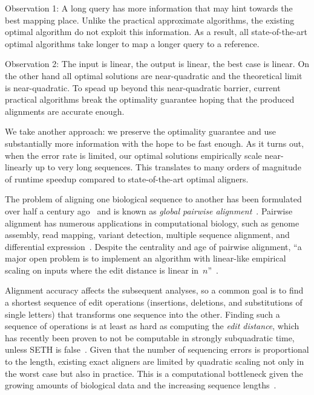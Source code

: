 Observation 1: A long query has more information that may hint towards the best
mapping place. Unlike the practical approximate algorithms, the existing optimal
algorithm do not exploit this information. As a result, all state-of-the-art
optimal algorithms take longer to map a longer query to a reference. 

Observation 2: The input is linear, the output is linear, the best case is
linear. On the other hand all optimal solutions are near-quadratic and the
theoretical limit is near-quadratic. To spead up beyond this near-quadratic
barrier, current practical algorithms break the optimality guarantee hoping that
the produced alignments are accurate enough. 

We take another approach: we preserve the optimality guarantee and use
substantially more information with the hope to be fast enough. As it turns out,
when the error rate is limited, our optimal solutions empirically scale
near-linearly up to very long sequences. This translates to many orders of
magnitude of runtime speedup compared to state-of-the-art optimal aligners.

The problem of aligning one biological sequence to another has been formulated
over half a century ago~\citep{needleman1970general} and is known as
\emph{global pairwise alignment}~\citep{navarro2001guided}. Pairwise alignment
has numerous applications in computational biology, such as genome assembly,
read mapping, variant detection, multiple sequence alignment, and differential
expression~\citep{prjibelski2018sequence}. Despite the centrality and age of
pairwise alignment, ``a major open problem is to implement an algorithm with linear-like
empirical scaling on inputs where the edit distance is linear
in~$n$''~\citep{medvedev2022theoretical}.

Alignment accuracy affects the subsequent analyses, so a common goal
is to find a shortest sequence of edit operations (insertions, deletions, and
substitutions of single letters) that transforms one sequence into the other.
Finding such a sequence of operations is at least as hard as computing the \emph{edit
distance}, which has recently been proven to not be computable in strongly
subquadratic time, unless SETH is false~\citep{backurs2015edit}. Given that
the number of sequencing errors is proportional to the length, existing exact aligners are
limited by quadratic scaling not only in the worst case but also in practice.
This is a computational bottleneck given the growing amounts of biological data
and the increasing sequence lengths~\citep{kucherov2019evolution}.

